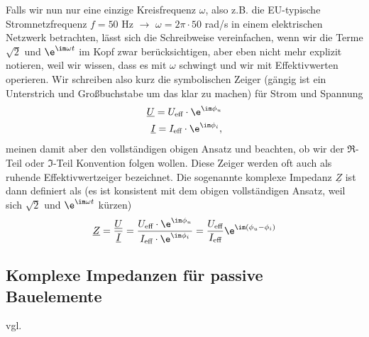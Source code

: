 Falls wir nun nur eine einzige Kreisfrequenz $\omega$, also z.B. die
EU-typische Stromnetzfrequenz $f=50$ Hz $\rightarrow$ $\omega = 2\pi \cdot 50$ rad/s
in einem elektrischen Netzwerk betrachten, lässt sich die Schreibweise vereinfachen,
wenn wir die Terme $\sqrt{2}$ und $\e^{\im \omega t}$ im Kopf zwar berücksichtigen,
aber eben nicht mehr explizit notieren, weil wir wissen, dass es mit $\omega$
schwingt und wir mit Effektivwerten operieren.
Wir schreiben also kurz die symbolischen Zeiger (gängig ist ein Unterstrich
und Großbuchstabe um das klar zu machen) für Strom und Spannung
\begin{align}
\underline{U} = U_\text{eff} \cdot \e^{\im \phi_u}\\
\underline{I} = I_\text{eff} \cdot \e^{\im \phi_i},
\end{align}
meinen damit aber den vollständigen obigen Ansatz und beachten, ob wir der
$\Re$-Teil oder $\Im$-Teil Konvention folgen wollen.
%
Diese Zeiger werden oft auch als ruhende Effektivwertzeiger bezeichnet.
%
Die sogenannte komplexe Impedanz $\underline{Z}$ ist dann definiert als (es ist konsistent mit dem
obigen vollständigen Ansatz, weil sich $\sqrt{2}$ und $\e^{\im\omega t}$ kürzen)
\begin{align}
\underline{Z} =
\frac{\underline{U}}{\underline{I}} =
\frac{U_\text{eff} \cdot \e^{\im \phi_u}}{I_\text{eff} \cdot \e^{\im \phi_i}} =
\frac{U_\text{eff}}{I_\text{eff}} \e^{\im (\phi_u-\phi_i)}
\end{align}

\subsection{Komplexe Impedanzen für passive Bauelemente}

vgl. \cite[Kap. 10.3.5]{Marinescu2020}

